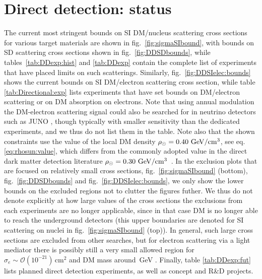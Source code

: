 \section{Direct detection: status}
\label{sec:status:direct:detection}
The current most stringent bounds on SI DM/nucleus scattering cross sections for various target materials are shown in fig.~\ref{fig:sigmaSIbound}, with bounds on SD scattering cross sections shown in fig.~\ref{fig:DDSDbounds}, while tables~\ref{tab:DDexp:hist} and \ref{tab:DDexp} contain the complete list of experiments that have placed limits on such scatterings. Similarly, fig.~\ref{fig:DDSIelec:bounds} shows the current bounds on SI DM/electron scattering cross section, while table \ref{tab:Directional:exp} lists experiments that have set bounds on DM/electron scattering or on DM absorption on electrons. Note that using annual modulation the DM-electron scattering signal could also be searched for in neutrino detectors such as JUNO \cite{2503.09685}, though typically with smaller sensitivity than the dedicated experiments, and we thus do not list them in the table.  Note also that the  shown constraints use the value of the local DM density $\rho_\odot= 0.40 \, \,{\rm GeV}/{\rm cm}^{3}$, see eq. \eqref{eq:rhosun:value}, which differs from the  commonly adopted value in the direct dark matter detection literature $\rho_\odot= 0.30 \, \,{\rm GeV}/{\rm cm}^{3}$~\cite{Baxter:2021pqo}. In the exclusion plots that are focused on relatively small cross sections, fig.~\ref{fig:sigmaSIbound} (bottom), fig.~\ref{fig:DDSDbounds} and fig.~\ref{fig:DDSIelec:bounds}, we only show the lower bounds on the excluded regions not to clutter the figures futher. We thus do not denote explicitly at how large values of the cross sections the exclusions from each experiments are no longer applicable, since in that case DM is no longer able to reach the underground detectors (this upper boundaries are denoted for SI scattering on nuclei in fig.~\ref{fig:sigmaSIbound} (top)). In general, such large cross sections are excluded from other searches, but for electron scattering via a light mediator there is possibly still a very small allowed region for $\sigma_e\sim {\mathcal O}(10^{-21})\,\text{cm}^2$ and DM mass  around \,GeV \cite{1905.06348}.  Finally, table \ref{tab:DDexp:fut} lists planned direct detection experiments, as well as concept and R\&D projects.






